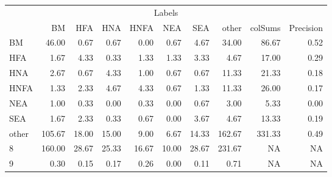 \begin{table}
\centering\begingroup\fontsize{11}{13}\selectfont

\begin{tabular}{lrrrrrr>{}r|rr}
\toprule
\multicolumn{10}{c}{Labels} \\
\cmidrule(l{3pt}r{3pt}){1-10}
  & BM & HFA & HNA & HNFA & NEA & SEA & other & colSums & Precision\\
\midrule
BM & 46.00 & 0.67 & 0.67 & 0.00 & 0.67 & 4.67 & 34.00 & 86.67 & 0.52\\
HFA & 1.67 & 4.33 & 0.33 & 1.33 & 1.33 & 3.33 & 4.67 & 17.00 & 0.29\\
HNA & 2.67 & 0.67 & 4.33 & 1.00 & 0.67 & 0.67 & 11.33 & 21.33 & 0.18\\
HNFA & 1.33 & 2.33 & 4.67 & 4.33 & 0.67 & 1.33 & 11.33 & 26.00 & 0.17\\
NEA & 1.00 & 0.33 & 0.00 & 0.33 & 0.00 & 0.67 & 3.00 & 5.33 & 0.00\\
\addlinespace
SEA & 1.67 & 2.33 & 0.33 & 0.67 & 0.00 & 3.67 & 4.67 & 13.33 & 0.19\\
other & 105.67 & 18.00 & 15.00 & 9.00 & 6.67 & 14.33 & 162.67 & 331.33 & 0.49\\
8 & 160.00 & 28.67 & 25.33 & 16.67 & 10.00 & 28.67 & 231.67 & NA & NA\\
9 & 0.30 & 0.15 & 0.17 & 0.26 & 0.00 & 0.11 & 0.71 & NA & NA\\
\bottomrule
\end{tabular}
\endgroup{}
\end{table}
